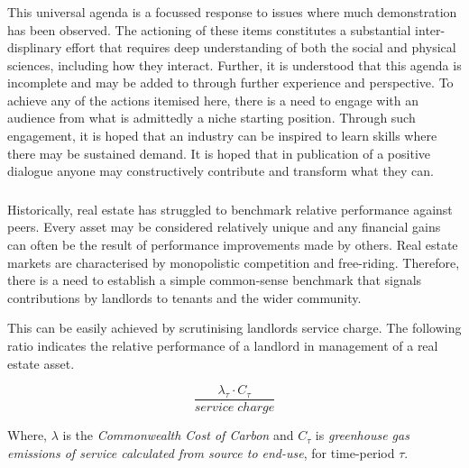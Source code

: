 \documentclass[11pt, oneside]{book}   	%
\begin{document}
\subsubsection{\color{Blue}{P3: Skills Gaps}}
This universal agenda is a focussed response to issues where much demonstration has been observed.
The actioning of these items constitutes a substantial inter-displinary effort that requires deep understanding of both the social and physical sciences, including how they interact.
Further, it is understood that this agenda is incomplete and may be added to through further experience and perspective.
To achieve any of the actions itemised here, there is a need to engage with an audience from what is admittedly a niche starting position.
Through such engagement, it is hoped that an industry can be inspired to learn skills where there may be sustained demand.
It is hoped that in publication of a positive dialogue anyone may constructively contribute and transform what they can.\

\subsubsection{\color{OliveGreen}{P4: Appropriate Real Estate Performance Benchmarking}}
Historically, real estate has struggled to benchmark relative performance against peers.
Every asset may be considered relatively unique and any financial gains can often be the result of performance improvements made by others.
Real estate markets are characterised by monopolistic competition and free-riding.
Therefore, there is a need to establish a simple common-sense benchmark that signals contributions by landlords to tenants and the wider community.\

This can be easily achieved by scrutinising landlords service charge.
The following ratio indicates the relative performance of a landlord in management of a real estate asset.

\begin{equation}
	\frac{\lambda_\tau \cdot C_\tau}{service\; charge}
\end{equation}

Where, $\lambda$ is the \emph{Commonwealth\; Cost\; of\; Carbon} and $C_\tau$ is \emph{greenhouse gas emissions of service calculated from source to end-use}, for time-period $\tau$.
\end{document}
